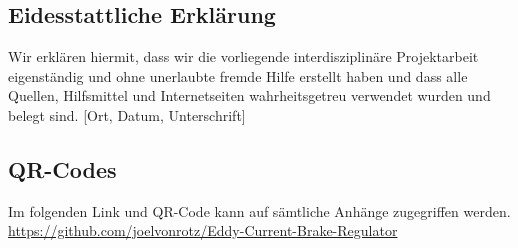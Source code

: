 \subsection{Eidesstattliche Erklärung}
Wir erklären hiermit, dass wir die vorliegende interdisziplinäre Projektarbeit eigenständig und ohne unerlaubte fremde Hilfe erstellt haben und dass alle Quellen, Hilfsmittel und Internetseiten wahrheitsgetreu verwendet wurden und belegt sind.
\vskip 3cm
[Ort, Datum, Unterschrift]

\subsection{QR-Codes}
Im folgenden Link und QR-Code kann auf sämtliche Anhänge zugegriffen werden.
\vskip 1cm
\newpara
\url{https://github.com/joelvonrotz/Eddy-Current-Brake-Regulator}
